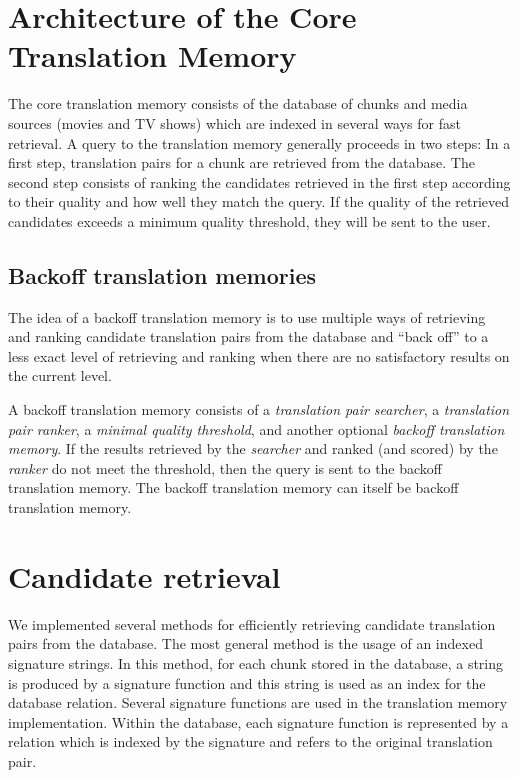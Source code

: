 \newpage
\section{Architecture of the Core Translation Memory}

The core translation memory consists of the database of chunks and media
sources (movies and TV shows) which are indexed in several ways for fast
retrieval. A query to the translation memory generally proceeds in two
steps: In a first step, translation pairs for a chunk are retrieved from
the database. The second step consists of ranking the candidates
retrieved in the first step according to their quality and how well they
match the query. If the quality of the retrieved candidates exceeds a
minimum quality threshold, they will be sent to the user.

\subsection{Backoff translation memories}

The idea of a backoff translation memory is to use multiple ways of
retrieving and ranking candidate translation pairs from the database and
``back off'' to a less exact level of retrieving and ranking when there
are no satisfactory results on the current level.

A backoff translation memory consists of a \emph{translation pair
searcher}, a \emph{translation pair ranker}, a \emph{minimal quality
threshold}, and another optional \emph{backoff translation memory}. If
the results retrieved by the \emph{searcher} and ranked (and scored) by
the \emph{ranker} do not meet the threshold, then the query is sent to
the backoff translation memory. The backoff translation memory can
itself be backoff translation memory.


\section{Candidate retrieval}

We implemented several methods for efficiently retrieving candidate
translation pairs from the database. The most general method
is the usage of an indexed signature strings. In this method, for each
chunk stored in the database, a string is produced by a signature
function and this string is used as an index for the database relation.
Several signature functions are used in the translation memory
implementation. Within the database, each signature function is represented by 
a relation which is indexed by the signature and refers to the original
translation pair.

